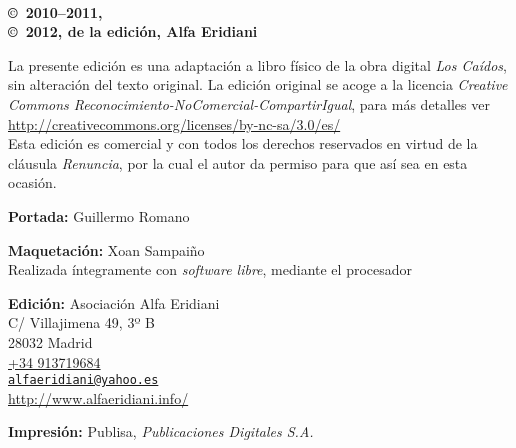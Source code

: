 \noindent
\textbf{\titlename}\\
\authorname

\footnotesize

\bigskip\bigskip\noindent
\textbf{\copyright\ 2010--2011, \authorname}\\
\textbf{\copyright\ 2012, de la edición, Alfa Eridiani}\\
{\raggedright La presente edición es una adaptación a libro físico de la obra digital \emph{Los Caídos}, sin alteración del texto original. La edición original se acoge a la licencia \emph{Creative Commons Reconocimiento-NoComercial-CompartirIgual}, para más detalles ver \url{http://creativecommons.org/licenses/by-nc-sa/3.0/es/}\\
Esta edición es comercial y con todos los derechos reservados en virtud de la cláusula \emph{Renuncia}, por la cual el autor da permiso para que así sea en esta ocasión.}

\footnotesize

\bigskip\noindent
\textbf{Portada:} Guillermo Romano

\smallskip\noindent
\textbf{Maquetación:} Xoan Sampaiño\\
Realizada íntegramente con \emph{software libre}, mediante el procesador \LaTeXe

\bigskip\noindent
\textbf{Edición:} Asociación Alfa Eridiani\\
C/ Villajimena 49, 3º B\\
28032 Madrid\\
\href{tel:+34913719684}{+34 913719684}\\
\href{mailto:alfaeridiani@yahoo.es}{\nolinkurl{alfaeridiani@yahoo.es}}\\
\url{http://www.alfaeridiani.info/}

\bigskip\noindent
\textbf{Impresión:} Publisa, \emph{Publicaciones Digitales S.A.}

\normalsize

\endinput
